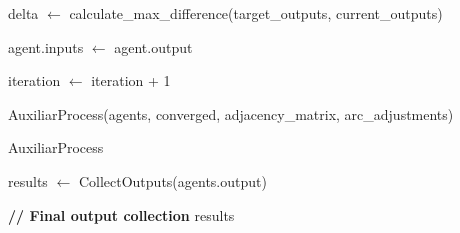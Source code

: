 \begin{algorithm}[H]
{{         delta $\leftarrow$ calculate\_max\_difference(target\_outputs, current\_outputs)\;
         
         
         agent.inputs $\leftarrow$ agent.output\;
         
         iteration $\leftarrow$ iteration + 1\;
     }
     
         \Return AuxiliarProcess(agents, converged, adjacency\_matrix, arc\_adjustments)\;
         }
         
        \end{algorithm}

\begin{algorithm}[H]
\caption{AuxiliarProcess}
 
     results $\leftarrow$ CollectOutputs(agents.output)\;
     
        \textbf{// Final output collection}
        \Return results\;

\end{algorithm}
 
 

